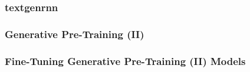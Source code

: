 
\subsubsection{textgenrnn}\label{sec:text-generation:textgenrnn}
\subsubsection{Generative Pre-Training (II)}\label{sec:text-generation:gpt-2}
\subsubsection{Fine-Tuning Generative Pre-Training (II) Models}\label{sec:text-generation-fine-tuning-gpt-2}


